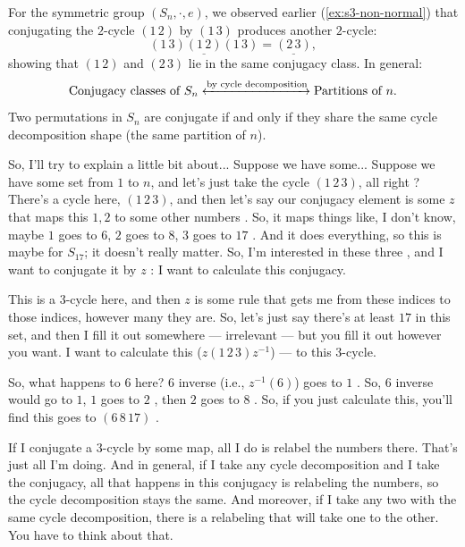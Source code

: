 \begin{content}
For the symmetric group $(S_n, \cdot, e)$, we observed earlier (\cref{ex:s3-non-normal}) that conjugating the $2$-cycle $(1\,2)$ by $(1\,3)$ produces another $2$-cycle:
\[
(1\,3)\underline{(1\,2)}(1\,3) = \underline{(2\,3)},
\]
showing that $(1\,2)$ and $(2\,3)$ lie in the same conjugacy class. In general:
\[
\text{Conjugacy classes of } S_n \xleftrightarrow{\text{by cycle decomposition}} \text{Partitions of } n.
\]
Two permutations in $S_n$ are conjugate if and only if they share the same cycle decomposition shape (the same partition of $n$).
\end{content}

\begin{speech}[01:21:37 - 01:23:51]
So, I'll try to explain a little bit about... Suppose we have some...  Suppose we have some set from $1$ to $n$, and let's just take the cycle $(1\,2\,3)$, all right ? There's a cycle here, $(1\,2\,3)$, and then let's say our conjugacy element is some $z$ that maps this $1, 2$ to some other numbers . So, it maps things like, I don't know, maybe $1$ goes to $6$, $2$ goes to $8$, $3$ goes to $17$ . And it does everything, so this is maybe for $S_{17}$; it doesn't really matter. So, I'm interested in these three , and I want to conjugate it by $z$ : I want to calculate this conjugacy.

This is a $3$-cycle here, and then $z$ is some rule that gets me from these indices to those indices, however many they are. So, let's just say there's at least $17$ in this set, and then I fill it out somewhere --- irrelevant --- but you fill it out however you want. I want to calculate this ($z(1\,2\,3)z^{-1}$) --- to this $3$-cycle.

So, what happens to $6$ here? $6$ inverse (i.e., $z^{-1}(6)$) goes to $1$ . So, $6$ inverse would go to $1$, $1$ goes to $2$ , then $2$ goes to $8$ . So, if you just calculate this, you'll find this goes to $(6\,8\,17)$ .

If I conjugate a $3$-cycle by some map, all I do is relabel the numbers there. That's just all I'm doing. And in general, if I take any cycle decomposition and I take the conjugacy, all that happens in this conjugacy is relabeling the numbers, so the cycle decomposition stays the same. And moreover, if I take any two with the same cycle decomposition, there is a relabeling that will take one to the other. You have to think about that.


\end{speech}
